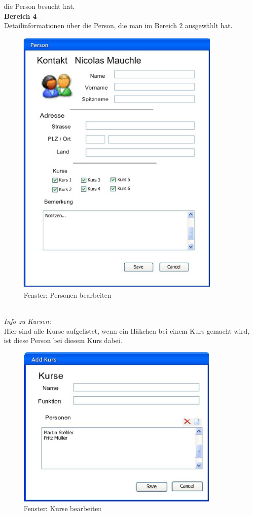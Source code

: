die Person besucht hat.
\\[2ex]
\textbf{Bereich 4}\\
Detailinformationen über die Person, die man im Bereich 2 ausgewählt hat.
\\[2ex]
\begin{figure}[ht]
\includegraphics[width=10cm]{images/editPerson.png}
\caption{Fenster: Personen bearbeiten}
\end{figure}
\\[2ex]
\textit{Info zu Kursen:}\\
Hier sind alle Kurse aufgelistet, wenn ein Häkchen bei einem Kurs gemacht wird, ist diese
Person bei diesem Kurs dabei.
\\
\begin{figure}[ht]
\includegraphics[width=10cm]{images/editCourse.png}
\caption{Fenster: Kurse bearbeiten}
\end{figure}
